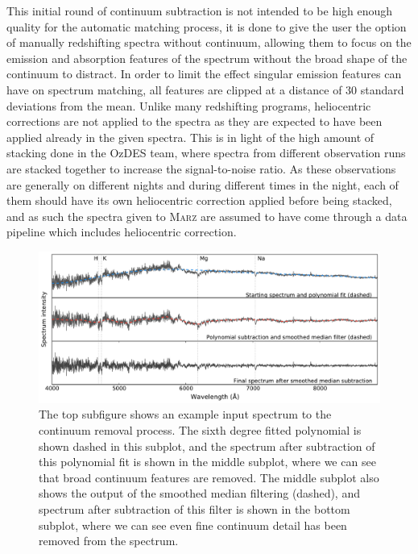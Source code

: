\documentclass[iop]{emulateapj}
\newcommand{\marz}{\textsc{Marz}}
\begin{document}
This initial round of continuum subtraction is not intended to be high enough quality for the automatic matching process, it is done to give the user the option of manually redshifting spectra without continuum, allowing them to focus on the emission and absorption features of the spectrum without the broad shape of the continuum to distract. In order to limit the effect singular emission features can have on spectrum matching, all features are clipped at a distance of 30 standard deviations from the mean. Unlike many redshifting programs, heliocentric corrections are not applied to the spectra as they are expected to have been applied already in the given spectra. This is in light of the high amount of stacking done in the OzDES team, where spectra from different observation runs are stacked together to increase the signal-to-noise ratio. As these observations are generally on different nights and during different times in the night, each of them should have its own heliocentric correction applied before being stacked, and as such the spectra given to \marz{} are assumed to have come through a data pipeline which includes heliocentric correction.\\


\begin{figure}[t]
\centering
\includegraphics[width=\textwidth]{continuum.pdf}
\caption{The top subfigure shows an example input spectrum to the continuum removal process. The sixth degree fitted polynomial is shown dashed in this subplot, and the spectrum after subtraction of this polynomial fit is shown in the middle subplot, where we can see that broad continuum features are removed. The middle subplot also shows the output of the smoothed median filtering (dashed), and spectrum after subtraction of this filter is shown in the bottom subplot, where we can see even fine continuum detail has been removed from the spectrum.}
\label{fig:continuum}
\end{figure}
\end{document}
